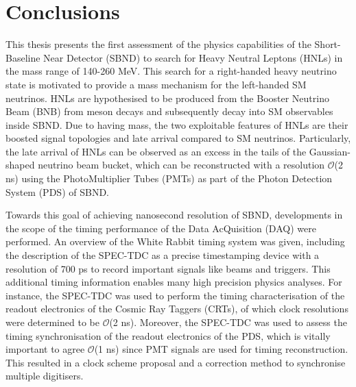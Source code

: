 
\chapter{Conclusions}  %


This thesis presents the first assessment of the physics capabilities of the Short-Baseline Near Detector (SBND) to search for Heavy Neutral Leptons (HNLs) in the mass range of 140-260 MeV.
This search for a right-handed heavy neutrino state is motivated to provide a mass mechanism for the left-handed SM neutrinos.
HNLs are hypothesised to be produced from the Booster Neutrino Beam (BNB) from meson decays and subsequently decay into SM observables inside SBND. 
Due to having mass, the two exploitable features of HNLs are their boosted signal topologies and late arrival compared to SM neutrinos.
Particularly, the late arrival of HNLs can be observed as an excess in the tails of the Gaussian-shaped neutrino beam bucket, which can be reconstructed with a resolution $\mathcal{O}$(2 ns) using the PhotoMultiplier Tubes (PMTs) as part of the Photon Detection System (PDS) of SBND.

Towards this goal of achieving nanosecond resolution of SBND, developments in the scope of the timing performance of the Data AcQuisition (DAQ) were performed.
An overview of the White Rabbit timing system was given, including the description of the SPEC-TDC as a precise timestamping device with a resolution of 700 ps to record important signals like beams and triggers.
This additional timing information enables many high precision physics analyses.
For instance, the SPEC-TDC was used to perform the timing characterisation of the readout electronics of the Cosmic Ray Taggers (CRTs), of which clock resolutions were determined to be $\mathcal{O}$(2 ns).
Moreover, the SPEC-TDC was used to assess the timing synchronisation of the readout electronics of the PDS, which is vitally important to agree $\mathcal{O}$(1 ns) since PMT signals are used for timing reconstruction.
This resulted in a clock scheme proposal and a correction method to synchronise multiple digitisers.

